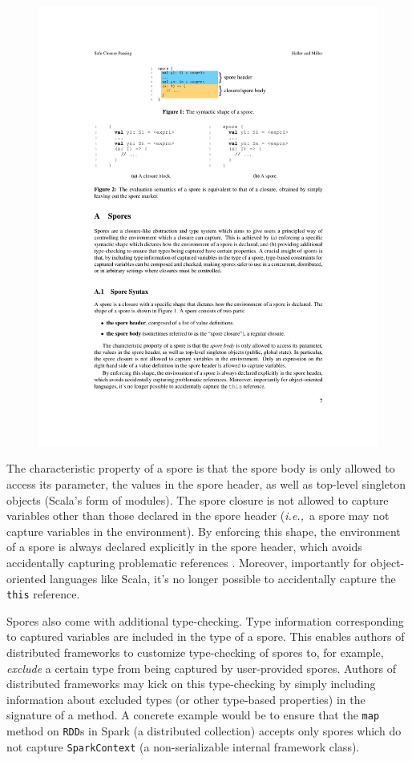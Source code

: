 \documentclass[preprint]{sigplanconf}
\theoremstyle{definition}
\theoremstyle{definition}
\newcommand{\ie}{{\em i.e.,~}}
\begin{document}
\begin{figure}[h!]
\centering\includegraphics[width=0.75\columnwidth]{spore-shape.pdf}
\end{figure}

The characteristic property of a spore is that the spore body is only allowed
to access its parameter, the values in the spore header, as well as top-level
singleton objects (Scala's form of modules). The spore closure is not allowed
to capture variables other than those declared in the spore header (\ie a spore
may not capture variables in the environment). By enforcing this shape, the
environment of a spore is always declared explicitly in the spore header, which
avoids accidentally capturing problematic references . Moreover, importantly for object-oriented 
languages like Scala, it's no longer possible to accidentally capture the 
\verb|this| reference.

Spores also come with additional type-checking. Type information corresponding
to captured variables are included in the type of a spore. This enables authors
of distributed frameworks to customize type-checking of spores to, for example,
{\em exclude} a certain type from being captured by user-provided spores.
Authors of distributed frameworks may kick on this type-checking by simply
including information about excluded types (or other type-based properties) in
the signature of a method. A concrete example would be to ensure that the
\verb|map| method on \verb|RDD|s in Spark (a distributed collection) accepts
only spores which do not capture \verb|SparkContext| (a non-serializable
internal framework class). 
\end{document}
